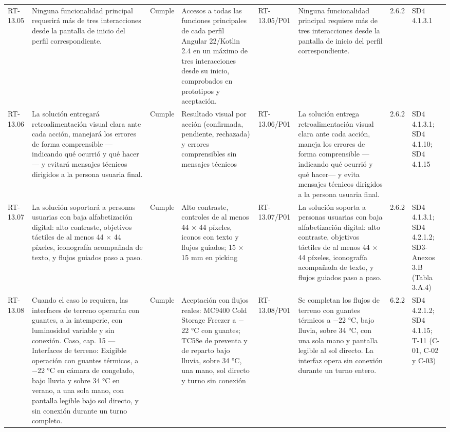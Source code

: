 \documentclass[oficio,firma,final]{lafrox}
\begin{document}
\begin{landscape}
{\begin{longtable}{@{}F{0.054} F{0.173} F{0.061} F{0.191} F{0.106} F{0.180} F{0.067} F{0.168}@{}}
  RT-13.05 & Ninguna funcionalidad principal requerirá más de tres interacciones desde la pantalla de inicio del perfil correspondiente. & Cumple & Accesos a todas las funciones principales de cada perfil Angular 22/Kotlin 2.4 en un máximo de tres interacciones desde su inicio, comprobados en prototipos y aceptación. & RT-13.05/\allowbreak{}P01 & Ninguna funcionalidad principal requiere más de tres interacciones desde la pantalla de inicio del perfil correspondiente. & 2.6.2 & SD4 4.1.3.1  \\
  RT-13.06 & La solución entregará retroalimentación visual clara ante cada acción, manejará los errores de forma comprensible —indicando qué ocurrió y qué hacer— y evitará mensajes técnicos dirigidos a la persona usuaria final. & Cumple & Resultado visual por acción (confirmada, pendiente, rechazada) y errores comprensibles sin mensajes técnicos & RT-13.06/\allowbreak{}P01 & La solución entrega retroalimentación visual clara ante cada acción, maneja los errores de forma comprensible —indicando qué ocurrió y qué hacer— y evita mensajes técnicos dirigidos a la persona usuaria final. & 2.6.2 & SD4 4.1.3.1; SD4 4.1.10; SD4 4.1.15  \\
  RT-13.07 & La solución soportará a personas usuarias con baja alfabetización digital: alto contraste, objetivos táctiles de al menos 44 $\times$ 44 píxeles, iconografía acompañada de texto, y flujos guiados paso a paso. & Cumple & Alto contraste, controles de al menos 44 $\times$ 44 píxeles, iconos con texto y flujos guiados; 15 $\times$ 15 mm en picking & RT-13.07/\allowbreak{}P01 & La solución soporta a personas usuarias con baja alfabetización digital: alto contraste, objetivos táctiles de al menos 44 $\times$ 44 píxeles, iconografía acompañada de texto, y flujos guiados paso a paso. & 2.6.2 & SD4 4.1.3.1; SD4 4.2.1.2; SD3-Anexos 3.B (Tabla 3.A.4)  \\
  RT-13.08 & Cuando el caso lo requiera, las interfaces de terreno operarán con guantes, a la intemperie, con luminosidad variable y sin conexión. Caso, cap. 15 — Interfaces de terreno: Exigible operación con guantes térmicos, a $-$22 °C en cámara de congelado, bajo lluvia y sobre 34 °C en verano, a una sola mano, con pantalla legible bajo sol directo, y sin conexión durante un turno completo. & Cumple & Aceptación con flujos reales: MC9400 Cold Storage Freezer a $-$22 °C con guantes; TC58e de preventa y de reparto bajo lluvia, sobre 34 °C, una mano, sol directo y turno sin conexión & RT-13.08/\allowbreak{}P01 & Se completan los flujos de terreno con guantes térmicos a $-$22 °C, bajo lluvia, sobre 34 °C, con una sola mano y pantalla legible al sol directo. La interfaz opera sin conexión durante un turno entero. & 6.2.2 & SD4 4.2.1.2; SD4 4.1.15; T-11 (C-01, C-02 y C-03)  \\

\end{longtable}}
\end{landscape}
\end{document}
